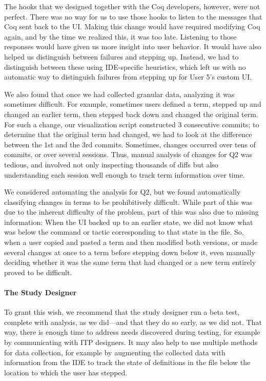 The hooks that we designed together with the Coq developers, however, 
were not perfect.
There was no way for us to use those hooks to listen to the messages
that Coq sent back to the UI.
Making this change would have required modifying Coq again, and by the time
we realized this, it was too late.
Listening to those responses would have given us more insight into user
behavior.
It would have also helped us distinguish between failures and stepping up.
Instead, we had to distinguish between these using IDE-specific heuristics,
which left us with no automatic way to distinguish failures from stepping up
for User 5's custom UI.

We also found that once we had collected granular data, 
analyzing it was sometimes difficult. 
For example, sometimes users defined a term, stepped up and changed
an earlier term, then stepped back down and changed the original term.
For such a change, our visualization script constructed 3 consecutive commits;
to determine that the original term had changed, we had to look at 
the difference between the 1st and the 3rd commits.
Sometimes, changes occurred over tens of commits, or over several sessions.
Thus, manual analysis of changes for Q2 was tedious, and involved
not only inspecting thousands of diffs but also understanding each 
session well enough to track term information over time.

We considered automating the analysis for Q2, but we found
automatically classifying changes in terms to be prohibitively difficult.
While part of this was due to the inherent difficulty of the problem,
part of this was also due to missing information:
When the UI backed up to an earlier state, we did not know what was below 
the command or tactic corresponding to that state in the file. 
So, when a user copied and pasted a term and then modified both versions,
or made several changes at once to a term before stepping 
down below it, even manually deciding whether it was the same term 
that had changed or a new term entirely proved to be difficult.

\paragraph{The Study Designer}
To grant this wish, we recommend that the study designer run a beta test, complete with analysis, as we did---and that they do so early,
as we did not.
That way, there is enough time to address needs discovered during testing,
for example by communicating with ITP designers.
It may also help to use multiple methods for data collection,
for example by augmenting the collected data with information from the IDE
to track the state of definitions in the file below the location to
which the user has stepped.

